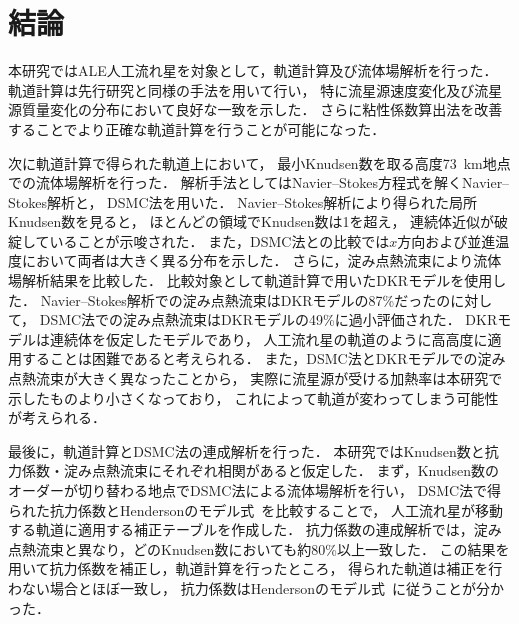 \chapter{結論}
\label{chap:conclusion}

本研究ではALE人工流れ星を対象として，軌道計算及び流体場解析を行った．
軌道計算は先行研究と同様の手法を用いて行い，
特に流星源速度変化及び流星源質量変化の分布において良好な一致を示した．
さらに粘性係数算出法を改善することでより正確な軌道計算を行うことが可能になった．

次に軌道計算で得られた軌道上において，
最小Knudsen数を取る高度73~km地点での流体場解析を行った．
解析手法としてはNavier–Stokes方程式を解くNavier–Stokes解析と，
DSMC法を用いた．
Navier–Stokes解析により得られた局所Knudsen数を見ると，
ほとんどの領域でKnudsen数は1を超え，
連続体近似が破綻していることが示唆された．
また，DSMC法との比較では$x$方向および並進温度において両者は大きく異る分布を示した．
さらに，淀み点熱流束により流体場解析結果を比較した．
比較対象として軌道計算で用いたDKRモデルを使用した．
Navier–Stokes解析での淀み点熱流束はDKRモデルの87\%だったのに対して，
DSMC法での淀み点熱流束はDKRモデルの49\%に過小評価された．
DKRモデルは連続体を仮定したモデルであり，
人工流れ星の軌道のように高高度に適用することは困難であると考えられる．
また，DSMC法とDKRモデルでの淀み点熱流束が大きく異なったことから，
実際に流星源が受ける加熱率は本研究で示したものより小さくなっており，
これによって軌道が変わってしまう可能性が考えられる．

最後に，軌道計算とDSMC法の連成解析を行った．
本研究ではKnudsen数と抗力係数・淀み点熱流束にそれぞれ相関があると仮定した．
まず，Knudsen数のオーダーが切り替わる地点でDSMC法による流体場解析を行い，
DSMC法で得られた抗力係数とHendersonのモデル式~\cite{henderson1976drag}を比較することで，
人工流れ星が移動する軌道に適用する補正テーブルを作成した．
抗力係数の連成解析では，淀み点熱流束と異なり，どのKnudsen数においても約80\%以上一致した．
この結果を用いて抗力係数を補正し，軌道計算を行ったところ，
得られた軌道は補正を行わない場合とほぼ一致し，
抗力係数はHendersonのモデル式~\cite{henderson1976drag}に従うことが分かった．

